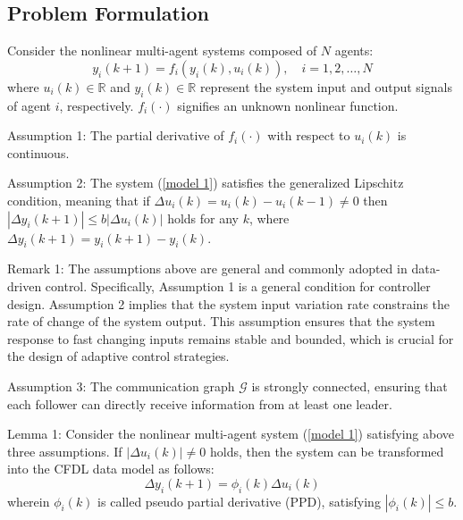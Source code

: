 \documentclass[journal,onecolumn]{IEEEtran}
\begin{document}
\subsection{Problem Formulation}

Consider the nonlinear multi-agent systems composed of $ N $ agents:
\begin{equation}
    \label{model 1}
    y_i(k+1) = f_i(y_i(k), u_i(k)), \quad i = 1, 2, \dots, N
\end{equation}
where $u_i(k) \in \mathbb{R}$ and $y_i(k) \in \mathbb{R}$ represent the system input and output signals of agent $ i $, respectively. $f_i(\cdot)$ signifies an unknown nonlinear function.

Assumption 1: The partial derivative of \( f_i(\cdot) \) with respect to \( u_i(k) \) is continuous.

Assumption 2: The system (\ref{model 1}) satisfies the generalized Lipschitz condition, meaning that if \( \Delta u_i(k) = u_i(k) - u_i(k - 1) \neq 0 \) then \( | \Delta y_i(k + 1) | \leq b |\Delta u_i(k)| \) holds for any \( k \), where \( \Delta y_i(k + 1) = y_i(k + 1) - y_i(k) \).
 


Remark 1: The assumptions above are general and commonly adopted in data-driven control. Specifically, Assumption 1 is a general condition for controller design. Assumption 2 implies that the system input variation rate constrains the rate of change of the system output. This assumption ensures that the system response to fast changing inputs remains stable and bounded, which is crucial for the design of adaptive control strategies.

Assumption 3: The communication graph $ \mathcal{G} $ is strongly connected, ensuring that each follower can directly receive information from at least one leader.

Lemma 1\cite{8}: Consider the nonlinear multi-agent system (\ref{model 1}) satisfying above three assumptions. If $ | \Delta u_i(k) | \neq 0 $ holds, then the system can be transformed into the CFDL data model as follows:
\begin{equation}
    \label{model 2}
    \Delta y_i(k+1)=\phi_i(k)\Delta u_i(k)
\end{equation}
wherein \(\phi_i(k)\) is called pseudo partial derivative (PPD), satisfying \( | \phi_i(k) | \leq b\).
 
\end{document}
